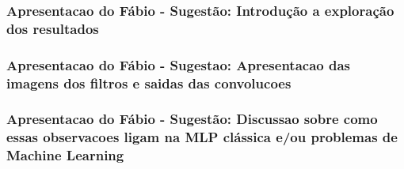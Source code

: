 \documentclass[11pt]{beamer}
\begin{document}
    \begin{frame}
      \frametitle{Apresentacao do Fábio - Sugestão: Introdução a exploração dos resultados}
    \end{frame}

    \begin{frame}
      \frametitle{Apresentacao do Fábio - Sugestao: Apresentacao das
        imagens dos filtros e saidas das convolucoes}
    \end{frame}

    \begin{frame}
      \frametitle{Apresentacao do Fábio - Sugestão: Discussao sobre
        como essas observacoes ligam na MLP clássica e/ou problemas de
        Machine Learning}
    \end{frame}
    
\end{document}
